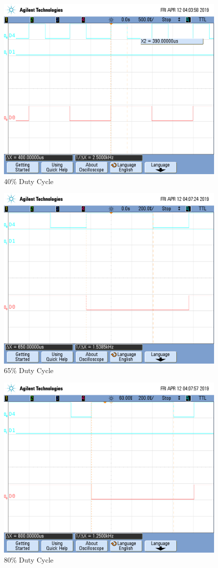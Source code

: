\documentclass[a4paper, 12pt]{article}
\begin{document}
\begin{figure}[H]
\centering
\includegraphics[width=.8\textwidth]{scope_7.png}
\caption{40\% Duty Cycle}
\label{fig:scope7}
\end{figure}

\begin{figure}[H]
\centering
\includegraphics[width=.8\textwidth]{scope_9.png}
\caption{65\% Duty Cycle}
\label{fig:scope9}
\end{figure}

\begin{figure}[H]
\centering
\includegraphics[width=.8\textwidth]{scope_10.png}
\caption{80\% Duty Cycle}
\label{fig:scope10}
\end{figure}
\end{document}
